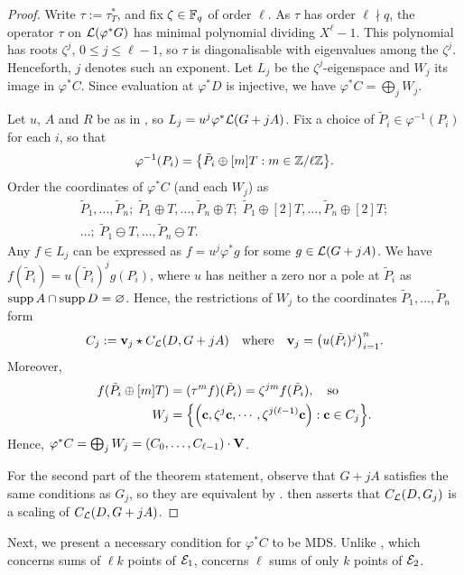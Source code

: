 \documentclass[twocolumn, 11pt]{scrartcl}
\begin{document}
\begin{proof}
    Write $\tau:=\tau_T^*$, and fix $\zeta\in\mathbb{F}_q$ of order $\ell$. As $\tau$ has order $\ell\nmid q$, the operator $\tau$ on $\mathcal{L}(\varphi^*G)$ has minimal polynomial dividing $X^\ell-1$. This polynomial has roots $\zeta^j$, $0\leq j\leq\ell-1$, so $\tau$ is diagonalisable with eigenvalues among the $\zeta^j$. Henceforth, $j$ denotes such an exponent. Let $L_j$ be the $\zeta^j$-eigenspace and $W_j$ its image in $\varphi^*C$. Since evaluation at $\varphi^*D$ is injective, we have $\varphi^*C=\bigoplus_j W_j$.

    Let $u$, $A$ and $R$ be as in , so $L_j=u^j\varphi^*\mathcal{L}(G+jA)$. Fix a choice of $\tilde P_i\in\varphi^{-1}(P_i)$ for each $i$, so that
    \[ \varphi^{-1}(P_i)=\set*{\tilde P_i\oplus[m]T:m\in\bbZ/\ell\bbZ}. \]
    Order the coordinates of $\varphi^*C$ (and each $W_j$) as
    \begin{align*}
    \tilde P_1,\hdots,\tilde P_n;\;\tilde P_1\oplus T,\hdots,\tilde P_n\oplus T;\;
    \tilde P_1\oplus [2]T,\hdots,\tilde P_n\oplus [2]T;\\
    \hdots;\;\tilde P_1\ominus T,\hdots,\tilde P_n\ominus T.
    \end{align*}
    Any $f\in L_j$ can be expressed as $f=u^j\varphi^*g$ for some $g\in\mathcal{L}(G+jA)$. We have $f(\tilde P_i)=u(\tilde P_i)^jg(P_i)$, where $u$ has neither a zero nor a pole at $\tilde P_i$ as $\operatorname{supp} A\cap\operatorname{supp} D=\varnothing$. Hence, the restrictions of $W_j$ to the coordinates $\tilde P_1,\hdots,\tilde P_n$ form
    \[ C_j:=\bfv_j\star C_\mcL(D,G+jA) \qwhr \bfv_j=\pa*{u(\tilde P_i)^j}_{i=1}^n.\]
    Moreover,
    \begin{align*}
        f(\tilde P_i\oplus[m]T)&=(\tau^mf)(\tilde P_i)=\zeta^{jm}f(\tilde P_i),\quad\text{so} \\
        W_j&=\set*{\pa*{\bfc,\zeta^j\bfc,\cdots,\zeta^{j(\ell-1)}\bfc}:\bfc\in C_j}.
    \end{align*}
    Hence, $\varphi^*C=\bigoplus_jW_j=(C_0,\hdots,C_{\ell-1})\cdot\mathbf{V}$.
    
    For the second part of the theorem statement, observe that $G+jA$ satisfies the same conditions as $G_j$, so they are equivalent by .  then asserts that $C_\mathcal{L}(D,G_j)$ is a scaling of $C_\mathcal{L}(D,G+jA)$.
\end{proof}

Next, we present a necessary condition for $\varphi^*C$ to be MDS. Unlike , which concerns sums of $\ell k$ points of $\mathcal{E}_1$,  concerns $\ell$ sums of only $k$ points of $\mathcal{E}_2$.
\end{document}
